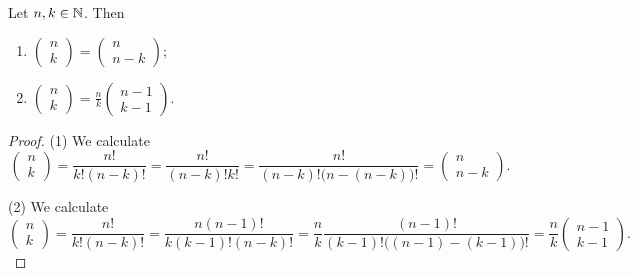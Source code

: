 \begin{lemma} \label{binomialCoefficientLemma}
Let $n,k\in \mathbb{N}$. Then
\begin{enumerate}
\item $\begin{pmatrix}
n \\ k
\end{pmatrix} = \begin{pmatrix}
n \\ n-k
\end{pmatrix}$;
\item $\begin{pmatrix}
n \\ k
\end{pmatrix} = \frac{n}{k}\begin{pmatrix}
n - 1 \\ k - 1
\end{pmatrix}$.
\end{enumerate}
\end{lemma}
\begin{proof}
(1) We calculate
\[ \begin{pmatrix}
n \\ k
\end{pmatrix} = \frac{n!}{k!(n-k)!} = \frac{n!}{(n-k)!k!} = \frac{n!}{(n-k)!\big(n-(n-k)\big)!} = \begin{pmatrix}
n \\ n-k
\end{pmatrix}. \]

(2) We calculate
\[ \begin{pmatrix}
n \\ k
\end{pmatrix} = \frac{n!}{k!(n-k)!} = \frac{n(n-1)!}{k(k-1)!(n-k)!} = \frac{n}{k}\frac{(n-1)!}{(k-1)!\big((n-1) - (k-1)\big)!} = \frac{n}{k}\begin{pmatrix}
n-1 \\ k-1
\end{pmatrix}. \]
\end{proof}


